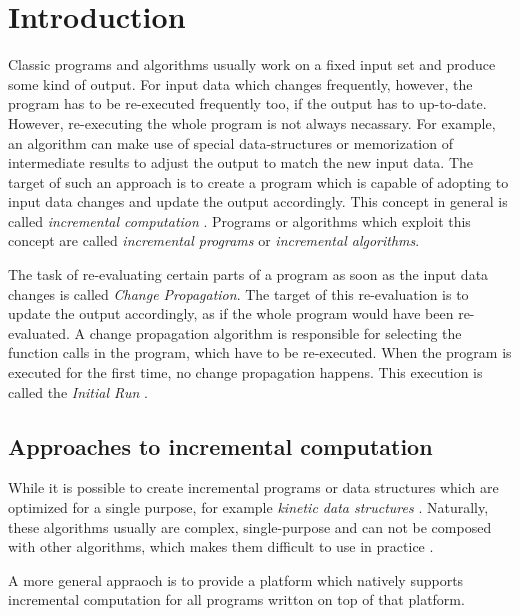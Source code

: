 \section{Introduction}
Classic programs and algorithms usually work on a fixed input set and produce some kind of output. For input data which changes frequently, however, the program has to be re-executed frequently too, if the output has to up-to-date. However, re-executing the whole program is not always necassary. For example, an algorithm can make use of special data-structures or memorization of intermediate results to adjust the output to match the new input data. The target of such an approach is to create a program which is capable of adopting to input data changes and update the output accordingly. This concept in general is called \textit{incremental computation} \cite{Ramalingam:IncrementalBibliography}. Programs or algorithms which exploit this concept are called \textit{incremental programs} or \textit{incremental algorithms}. 

The task of re-evaluating certain parts of a program as soon as the input data changes is called \textit{Change Propagation}. The target of this re-evaluation is to update the output accordingly, as if the whole program would have been re-evaluated. A change propagation algorithm is responsible for selecting the function calls in the program, which have to be re-executed. When the program is executed for the first time, no change propagation happens. This execution is called the \textit{Initial Run} \cite{Acar2005thesis}.

\subsection{Approaches to incremental computation}
While it is possible to create incremental programs or data structures which are optimized for a single purpose, for example \textit{kinetic data structures} \cite{??}. Naturally, these algorithms usually are complex, single-purpose and can not be composed with other algorithms, which makes them difficult to use in practice \cite{Acar2005thesis}.
 
A more general appraoch is to provide a platform which natively supports incremental computation for all programs writton on top of that platform. 

